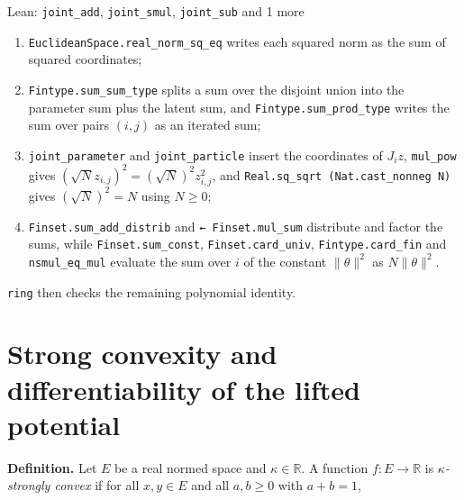 \documentclass[11pt,a4paper]{article}
\begin{document}
\begin{leanbox}{Lean: \texttt{joint\_\allowbreak{}add}, \texttt{joint\_\allowbreak{}smul}, \texttt{joint\_\allowbreak{}sub} and 1 more}
\begin{enumerate}


\item \texttt{Euclidean\allowbreak{}Space.\allowbreak{}real\_\allowbreak{}norm\_\allowbreak{}sq\_\allowbreak{}eq} writes each squared norm as the sum of squared coordinates;

\item \texttt{Fintype.\allowbreak{}sum\_\allowbreak{}sum\_\allowbreak{}type} splits a sum over the disjoint union into the parameter sum plus the latent sum, and \texttt{Fintype.\allowbreak{}sum\_\allowbreak{}prod\_\allowbreak{}type} writes the sum over pairs \((i,j)\) as an iterated sum;

\item \texttt{joint\_\allowbreak{}parameter} and \texttt{joint\_\allowbreak{}particle} insert the coordinates of \(J_iz\), \texttt{mul\_\allowbreak{}pow} gives \((\sqrt Nz_{i,j})^2=(\sqrt N)^2z_{i,j}^2\), and \texttt{Real.\allowbreak{}sq\_\allowbreak{}sqrt (Nat.\allowbreak{}cast\_\allowbreak{}nonneg N)} gives \((\sqrt N)^2=N\) using \(N\ge0\);

\item \texttt{Finset.\allowbreak{}sum\_\allowbreak{}add\_\allowbreak{}distrib} and \texttt{← Finset.\allowbreak{}mul\_\allowbreak{}sum} distribute and factor the sums, while \texttt{Finset.\allowbreak{}sum\_\allowbreak{}const}, \texttt{Finset.\allowbreak{}card\_\allowbreak{}univ}, \texttt{Fintype.\allowbreak{}card\_\allowbreak{}fin} and \texttt{nsmul\_\allowbreak{}eq\_\allowbreak{}mul} evaluate the sum over \(i\) of the constant \(\|\theta\|^2\) as \(N\|\theta\|^2\).

\end{enumerate}



\texttt{ring} then checks the remaining polynomial identity.
\end{leanbox}

\section{\texorpdfstring{Strong convexity and differentiability of the lifted potential}{Strong convexity and differentiability of the lifted potential}}


\textbf{Definition.} Let \(E\) be a real normed space and \(\kappa\in\mathbb R\). A function \(f:E\to\mathbb R\) is \emph{\(\kappa\)-strongly convex} if for all \(x,y\in E\) and all \(a,b\ge0\) with \(a+b=1\),
\end{document}

